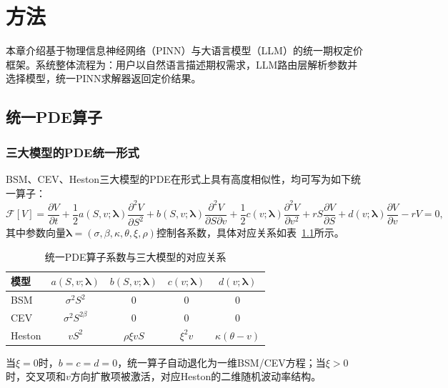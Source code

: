 \chapter{方法}\label{chap:method}

本章介绍基于物理信息神经网络（PINN）与大语言模型（LLM）的统一期权定价框架。系统整体流程为：用户以自然语言描述期权需求，LLM路由层解析参数并选择模型，统一PINN求解器返回定价结果。

\section{统一PDE算子}\label{sec:unified_pde}

\subsection{三大模型的PDE统一形式}

BSM、CEV、Heston三大模型的PDE在形式上具有高度相似性，均可写为如下统一算子：
\begin{equation}\label{eq:unified_pde}
  \mathcal{F}[V] =
    \frac{\partial V}{\partial t}
    + \frac{1}{2}a(S,v;\boldsymbol{\lambda})\frac{\partial^2 V}{\partial S^2}
    + b(S,v;\boldsymbol{\lambda})\frac{\partial^2 V}{\partial S\partial v}
    + \frac{1}{2}c(v;\boldsymbol{\lambda})\frac{\partial^2 V}{\partial v^2}
    + rS\frac{\partial V}{\partial S}
    + d(v;\boldsymbol{\lambda})\frac{\partial V}{\partial v}
    - rV = 0,
\end{equation}
其中参数向量$\boldsymbol{\lambda}=(\sigma,\beta,\kappa,\theta,\xi,\rho)$控制各系数，具体对应关系如表~\ref{tab:unified_coefficients}所示。

\begin{table}[htbp]
  \centering
  \caption{统一PDE算子系数与三大模型的对应关系}
  \label{tab:unified_coefficients}
  \begin{tabular}{lcccc}
    \hline
    模型 & $a(S,v;\boldsymbol{\lambda})$ & $b(S,v;\boldsymbol{\lambda})$ & $c(v;\boldsymbol{\lambda})$ & $d(v;\boldsymbol{\lambda})$ \\
    \hline
    BSM & $\sigma^2 S^2$ & $0$ & $0$ & $0$ \\
    CEV & $\sigma^2 S^{2\beta}$ & $0$ & $0$ & $0$ \\
    Heston & $vS^2$ & $\rho\xi vS$ & $\xi^2 v$ & $\kappa(\theta-v)$ \\
    \hline
  \end{tabular}
\end{table}

当$\xi=0$时，$b=c=d=0$，统一算子自动退化为一维BSM/CEV方程；当$\xi>0$时，交叉项和$v$方向扩散项被激活，对应Heston的二维随机波动率结构。


